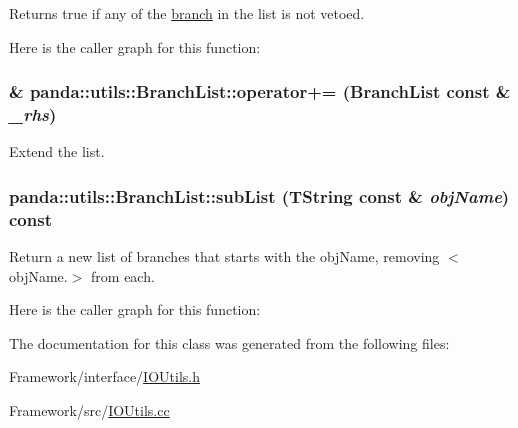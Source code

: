 Returns true if any of the \hyperlink{namespacepanda_1_1branch}{branch} in the list is not vetoed. 

Here is the caller graph for this function:\hypertarget{classpanda_1_1utils_1_1BranchList_a4cb8f7877ab1f20bd4f7714e840b5a1e}{
\subsubsection[{operator+=}]{ \& panda::utils::BranchList::operator+= ({\bf BranchList} const \& {\em \_\-rhs})}}
\label{classpanda_1_1utils_1_1BranchList_a4cb8f7877ab1f20bd4f7714e840b5a1e}


Extend the list. \hypertarget{classpanda_1_1utils_1_1BranchList_a215520401f32786d157a68ee92d90372}{
\subsubsection[{subList}]{ panda::utils::BranchList::subList (TString const \& {\em objName}) const}}
\label{classpanda_1_1utils_1_1BranchList_a215520401f32786d157a68ee92d90372}


Return a new list of branches that starts with the objName, removing $<$objName.$>$ from each. 

Here is the caller graph for this function:

The documentation for this class was generated from the following files:\begin{DoxyCompactItemize}
\item 
Framework/interface/\hyperlink{IOUtils_8h}{IOUtils.h}\item 
Framework/src/\hyperlink{IOUtils_8cc}{IOUtils.cc}\end{DoxyCompactItemize}
